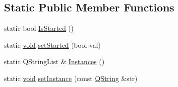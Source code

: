 \subsection*{Static Public Member Functions}
\begin{DoxyCompactItemize}
\item 
static bool \hyperlink{group___h_i_t_l_plugin_gab258fc4b0cfb2d1fc7cfc2e39f12295f}{Is\-Started} ()
\item 
static \hyperlink{group___u_a_v_objects_plugin_ga444cf2ff3f0ecbe028adce838d373f5c}{void} \hyperlink{group___h_i_t_l_plugin_ga077a3be12724a8b465c5ed557abbca33}{set\-Started} (bool val)
\item 
static Q\-String\-List \& \hyperlink{group___h_i_t_l_plugin_ga7a56fe71f90b375de179eea6369025c9}{Instances} ()
\item 
static \hyperlink{group___u_a_v_objects_plugin_ga444cf2ff3f0ecbe028adce838d373f5c}{void} \hyperlink{group___h_i_t_l_plugin_ga8f691dedcee72e956c36f52009718cad}{set\-Instance} (const \hyperlink{group___u_a_v_objects_plugin_gab9d252f49c333c94a72f97ce3105a32d}{Q\-String} \&str)
\end{DoxyCompactItemize}
